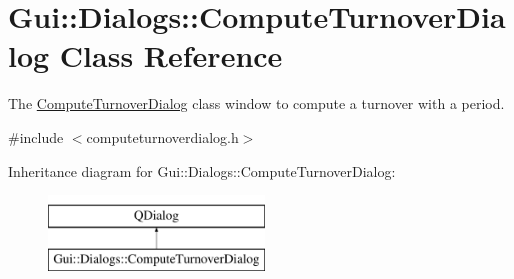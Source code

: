 \hypertarget{classGui_1_1Dialogs_1_1ComputeTurnoverDialog}{\section{Gui\-:\-:Dialogs\-:\-:Compute\-Turnover\-Dialog Class Reference}
\label{classGui_1_1Dialogs_1_1ComputeTurnoverDialog}
}


The \hyperlink{classGui_1_1Dialogs_1_1ComputeTurnoverDialog}{Compute\-Turnover\-Dialog} class window to compute a turnover with a period.  




{\ttfamily \#include $<$computeturnoverdialog.\-h$>$}

Inheritance diagram for Gui\-:\-:Dialogs\-:\-:Compute\-Turnover\-Dialog\-:\begin{figure}[H]
\begin{center}
\leavevmode
\includegraphics[height=2.000000cm]{d1/d0e/classGui_1_1Dialogs_1_1ComputeTurnoverDialog}
\end{center}
\end{figure}
